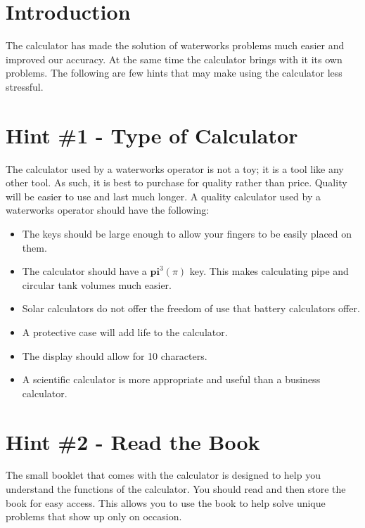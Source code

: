\documentclass[10pt]{article}
\begin{document}
\section{Introduction}
The calculator has made the solution of waterworks problems much easier and improved our accuracy. At the same time the calculator brings with it its own problems. The following are few hints that may make using the calculator less stressful.

\section{Hint \#1 - Type of Calculator}
The calculator used by a waterworks operator is not a toy; it is a tool like any other tool. As such, it is best to purchase for quality rather than price. Quality will be easier to use and last much longer. A quality calculator used by a waterworks operator should have the following:

\begin{itemize}
  \item The keys should be large enough to allow your fingers to be easily placed on them.

  \item The calculator should have a $\mathbf{p i}^{3}(\pi)$ key. This makes calculating pipe and circular tank volumes much easier.

  \item Solar calculators do not offer the freedom of use that battery calculators offer.

  \item A protective case will add life to the calculator.

  \item The display should allow for 10 characters.

  \item A scientific calculator is more appropriate and useful than a business calculator.

\end{itemize}
\section{Hint \#2 - Read the Book}
The small booklet that comes with the calculator is designed to help you understand the functions of the calculator. You should read and then store the book for easy access. This allows you to use the book to help solve unique problems that show up only on occasion.
\end{document}

